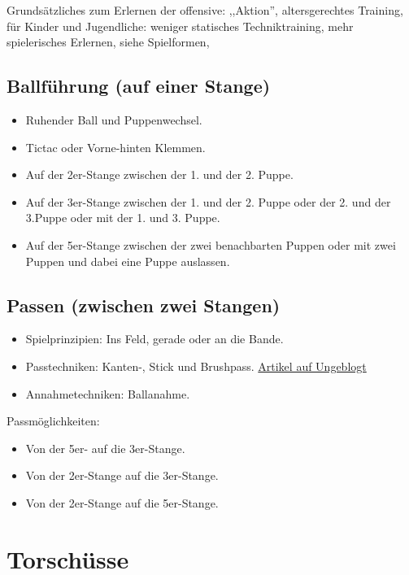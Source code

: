 Grundsätzliches zum Erlernen der \gls{offensive}: ,,Aktion'', altersgerechtes Training,  für Kinder und Jugendliche: weniger statisches Techniktraining, mehr spielerisches Erlernen, siehe Spielformen,


\subsection{Ballführung (auf einer Stange)} 
\label{technik:ballkontrolle:eine}

\begin{itemize}
\item Ruhender Ball und Puppenwechsel.
\item Tictac oder Vorne-hinten Klemmen.
\item Auf der 2er-Stange zwischen der 1. und der 2. Puppe.
\item Auf der 3er-Stange zwischen der 1. und der 2. Puppe oder der 2. und der 3.Puppe oder mit der 1. und 3. Puppe.
\item Auf der 5er-Stange zwischen der zwei benachbarten Puppen oder mit zwei Puppen und dabei eine Puppe auslassen.
\end{itemize}


\subsection{Passen (zwischen zwei Stangen)}
\label{technik:ballkontrolle:zwei}

\begin{itemize}
\item Spielprinzipien: Ins Feld, gerade oder an die Bande.
\item Passtechniken: Kanten-, Stick und Brushpass. 
\href{http://ungeblogtkickern.blogspot.de/2015/09/schrag-schieen.html}{Artikel auf Ungeblogt}
\item Annahmetechniken: Ballanahme.
\end{itemize}

Passmöglichkeiten:
\begin{itemize}
\item Von der 5er- auf die 3er-Stange.
\item Von der 2er-Stange auf die 3er-Stange.
\item Von der 2er-Stange auf die 5er-Stange.
\end{itemize}


\section{Torschüsse}
\label{technik:torschuesse}

